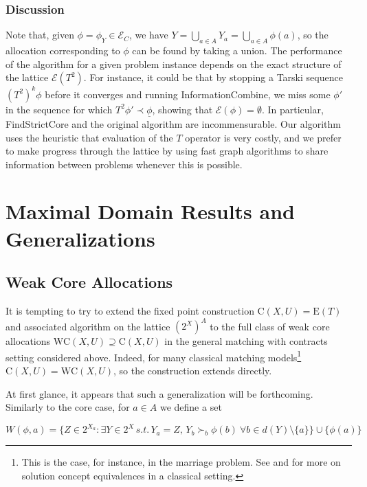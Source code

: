 \documentclass[11pt,reqno]{amsart}
\theoremstyle{definition}
\numberwithin{equation}{section}
\newcommand{\ul}{\underline}
\newcommand{\pre}{\phi}
\newcommand{\prealloc}{(2^X)^A}
\newcommand{\strcore}{\mathrm{C}(X,U)}
\newcommand{\core}{\mathrm{WC}(X,U)}
\newcommand{\fecon}{\mathrm{E}}
\newcommand{\fix}{\mathcal{E}}
\newcommand{\su}{\succ}
\newcommand{\pe}{\prec}
\newcommand{\bopre}{\ul{\pre}}
\newcommand{\fixfind}{\mathcal{E}_C}
\begin{document}
\subsubsection{Discussion} 
Note that, given $\pre = \pre_Y \in \fixfind$, we have $Y = \bigcup_{a \in A} Y_a = \bigcup_{a \in A} \pre(a)$, so the allocation corresponding to $\pre$ can be found by taking a union.
The performance of the algorithm for a given problem instance depends on the exact structure of the lattice $\fix(T^2)$.
For instance, it could be that by stopping a Tarski sequence $(T^2)^k \pre$ before it converges and running InformationCombine, we miss some $\pre'$ in the sequence for which $T^2 \pre' \pe \bopre$, showing that $\fix(\pre) = \emptyset$. 
In particular, FindStrictCore and the original \cite{EcheniqueYenmez2013} algorithm are incommensurable. 
Our algorithm uses the heuristic that evaluation of the $T$ operator is very costly, and we prefer to make progress through the lattice by using fast graph algorithms to share information between problems whenever this is possible. 

\section{Maximal Domain Results and Generalizations} 
\subsection{Weak Core Allocations}
It is tempting to try to extend the fixed point construction $\strcore = \fecon(T)$ and associated algorithm on the lattice $\prealloc$ to the full class of weak core allocations $\core \supseteq \strcore$ in the general matching with contracts setting considered above. 
Indeed, for many classical matching models\footnote{This is the case, for instance, in the marriage problem. 
See \cite{Blair1988} and \cite{EcheniqueOviedo2006} for more on solution concept equivalences in a classical setting.} $\strcore = \core$, so the construction extends directly.

At first glance, it appears that such a generalization will be forthcoming. 
Similarly to the core case, for $a \in A$ we define a set 

\[
W(\pre, a) = \{Z \in 2^{X_a}: \exists Y \in 2^X \, s.t. \,  Y_a = Z, \, Y_b \su_b \pre(b) \: \forall b \in d(Y)\setminus\{a\} \} \cup \{\pre(a)\}
\]
\end{document}
